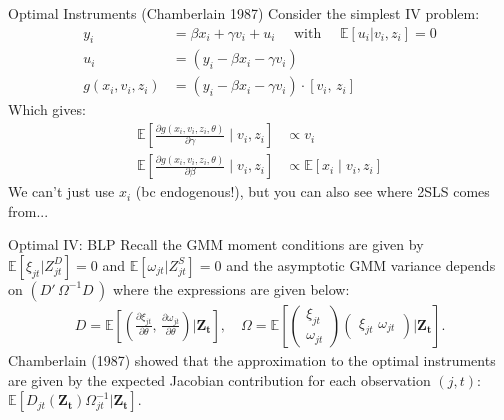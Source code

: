 \documentclass[xcolor=pdftex,dvipsnames,table,mathserif,aspectratio=169]{beamer}
\begin{document}
\begin{frame}{Optimal Instruments (Chamberlain 1987)}
Consider the simplest IV problem:
\begin{align*}
y_i &= \beta x_i + \gamma v_i + u_i \quad \text{ with } \quad \mathbb{E}[u_i | v_i, z_i] =0 \\
u_i &= \left(y_i - \beta x_i - \gamma v_i \right) \\
g(x_i,v_i,z_i) &= \left(y_i - \beta x_i - \gamma v_i \right) \cdot [v_i,\, z_i]
 \end{align*}
 Which gives:
\begin{align*}
\mathbb{E}\left[\frac{\partial g(x_i,v_i, z_i,\theta)}{\partial \gamma} \mid v_i, z_i \right] &\propto v_i\\
\mathbb{E}\left[\frac{\partial g(x_i,v_i, z_i,\theta)}{\partial \beta} \mid v_i, z_i \right] &
\propto \mathbb{E}\left[x_i \mid v_i, z_i \right]
\end{align*}
We can't just use $x_i$ (bc endogenous!), but you can also see where 2SLS comes from...
\end{frame}



\begin{frame}{Optimal IV: BLP}
Recall the GMM moment conditions are given by $\mathbb{E}[\xi_{jt} | Z_{jt}^D]=0$ and $\mathbb{E}[\omega_{jt} | Z_{jt}^S]=0$ and the asymptotic GMM variance depends on $(D'\, \Omega^{-1} D\,)$ where the expressions are given below:
\begin{align*}
    D=\mathbb{E}\left[
    \left(\frac{\partial \xi_{jt}}{\partial \theta}, \,
    \frac{\partial \omega_{jt}}{\partial \theta} \right)
| \mathbf{Z_t} \right], \quad 
\Omega = \mathbb{E}\left[
\begin{pmatrix}
    \xi_{jt} \\
    \omega_{jt}
\end{pmatrix}
\begin{pmatrix}
    \xi_{jt}\, \,
    \omega_{jt}
\end{pmatrix}
| \mathbf{Z_t} \right].
\end{align*}
Chamberlain (1987) showed that the approximation to the optimal instruments are given by the expected Jacobian contribution for each observation $(j,t)$: $\mathbb{E}[D_{jt}(\mathbf{Z_t}) \Omega_{jt}^{-1} | \mathbf{Z_t}]$.
\end{frame}
\end{document}
